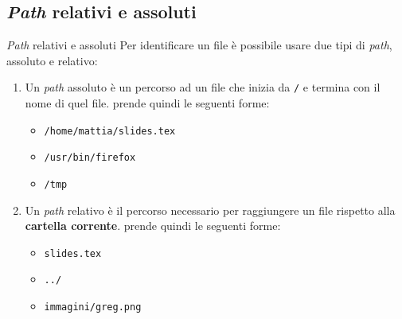\subsection{\textit{Path} relativi e assoluti}
\begin{frame}{\textit{Path} relativi e assoluti}
  Per identificare un file è possibile usare due tipi di \textit{path}, assoluto 
  e relativo:
  \begin{enumerate}
    \item Un \textit{path} assoluto è un percorso ad un file che inizia da 
      \texttt{/} e termina con il nome di quel file. prende quindi le seguenti
      forme:
      \begin{itemize}
        \item \texttt{/home/mattia/slides.tex}
        \item \texttt{/usr/bin/firefox}
        \item \texttt{/tmp}
      \end{itemize}
    \item Un \textit{path} relativo è il percorso necessario per raggiungere un
      file rispetto alla \textbf{cartella corrente}. prende quindi le seguenti
      forme:
      \begin{itemize}
        \item \texttt{slides.tex}
        \item \texttt{../}
        \item \texttt{immagini/greg.png}
      \end{itemize}
  \end{enumerate}
\end{frame}
